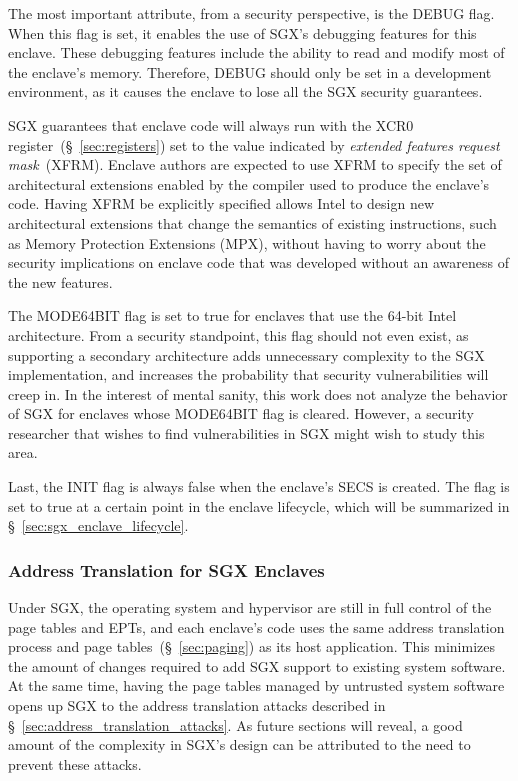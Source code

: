 The most important attribute, from a security perspective, is the DEBUG flag.
When this flag is set, it enables the use of SGX's debugging features for this
enclave. These debugging features include the ability to read and modify most
of the enclave's memory. Therefore, DEBUG should only be set in a development
environment, as it causes the enclave to lose all the SGX security guarantees.

SGX guarantees that enclave code will always run with the XCR0
register~(\S~\ref{sec:registers}) set to the value indicated by
\textit{extended features request mask}~(XFRM). Enclave authors are expected to
use XFRM to specify the set of architectural extensions enabled by the compiler
used to produce the enclave's code. Having XFRM be explicitly specified allows
Intel to design new architectural extensions that change the semantics of
existing instructions, such as Memory Protection Extensions (MPX), without
having to worry about the security implications on enclave code that was
developed without an awareness of the new features.

The MODE64BIT flag is set to true for enclaves that use the 64-bit Intel
architecture. From a security standpoint, this flag should not even exist, as
supporting a secondary architecture adds unnecessary complexity to the SGX
implementation, and increases the probability that security vulnerabilities
will creep in. In the interest of mental sanity, this work does not analyze the
behavior of SGX for enclaves whose MODE64BIT flag is cleared. However, a
security researcher that wishes to find vulnerabilities in SGX might wish to
study this area.

Last, the INIT flag is always false when the enclave's SECS is created. The
flag is set to true at a certain point in the enclave lifecycle, which will be
summarized in \S~\ref{sec:sgx_enclave_lifecycle}.


\subsubsection{Address Translation for SGX Enclaves}
\label{sec:sgx_paging}


Under SGX, the operating system and hypervisor are still in full control of the
page tables and EPTs, and each enclave's code uses the same address translation
process and page tables~(\S~\ref{sec:paging}) as its host application. This
minimizes the amount of changes required to add SGX support to existing system
software. At the same time, having the page tables managed by untrusted system
software opens up SGX to the address translation attacks described in
\S~\ref{sec:address_translation_attacks}. As future sections will reveal, a
good amount of the complexity in SGX's design can be attributed to the need to
prevent these attacks.

